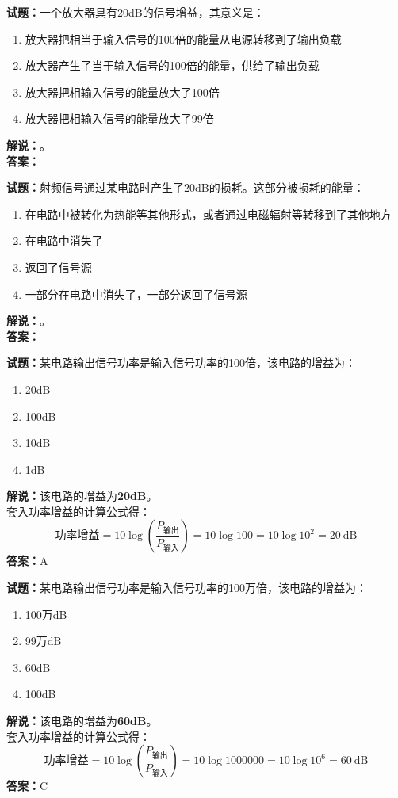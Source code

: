 \documentclass{ctexbook}
\begin{document}
\vspace{\baselineskip}

\noindent\textbf{试题：}一个放大器具有20dB的信号增益，其意义是：
\begin{enumerate}[leftmargin=3em]
  \item 放大器把相当于输入信号的100倍的能量从电源转移到了输出负载
  \item 放大器产生了当于输入信号的100倍的能量，供给了输出负载
  \item 放大器把相输入信号的能量放大了100倍
  \item 放大器把相输入信号的能量放大了99倍
\end{enumerate}
\noindent\textbf{解说：}\textbf{}。\\\noindent\textbf{答案：}

\vspace{\baselineskip}

\noindent\textbf{试题：}射频信号通过某电路时产生了20dB的损耗。这部分被损耗的能量：
\begin{enumerate}[leftmargin=3em]
  \item 在电路中被转化为热能等其他形式，或者通过电磁辐射等转移到了其他地方
  \item 在电路中消失了
  \item 返回了信号源
  \item 一部分在电路中消失了，一部分返回了信号源
\end{enumerate}
\noindent\textbf{解说：}\textbf{}。\\\noindent\textbf{答案：}

\vspace{\baselineskip}

\noindent\textbf{试题：}某电路输出信号功率是输入信号功率的100倍，该电路的增益为：
\begin{enumerate}[leftmargin=3em]
  \item 20dB
  \item 100dB
  \item 10dB
  \item 1dB
\end{enumerate}
\noindent\textbf{解说：}该电路的增益为\textbf{20dB}。\\
套入功率增益的计算公式得：
$$\mbox{功率增益}=10 \log \left( {\frac{P_{ \mbox{输出} }}{P_{ \mbox{输入} }}} \right)=10 \log 100 = 10 \log 10^2 = 20 \ \mathrm{dB}$$
\noindent\textbf{答案：}A

\vspace{\baselineskip}

\noindent\textbf{试题：}某电路输出信号功率是输入信号功率的100万倍，该电路的增益为：
\begin{enumerate}[leftmargin=3em]
  \item 100万dB
  \item 99万dB
  \item 60dB
  \item 100dB
\end{enumerate}
\noindent\textbf{解说：}该电路的增益为\textbf{60dB}。\\
套入功率增益的计算公式得：
$$\mbox{功率增益}=10 \log \left( {\frac{P_{ \mbox{输出} }}{P_{ \mbox{输入} }}} \right)=10 \log 1000000 = 10 \log 10^6 = 60 \ \mathrm{dB}$$
\noindent\textbf{答案：}C
\end{document}
